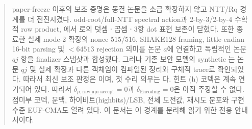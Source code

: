 \documentclass[11pt,a4paper]{article}
\begin{document}
\begin{abstract}
paper-freeze 이후의 보조 증명은 동결 논문을 소급 확장하지 않고 NTT/Rq
경계를 더 전진시켰다. odd-root/full-NTT spectral action과 2-by-3/2-by-4
수학적 row product, 에서
로의 덧셈ㆍ곱셈ㆍ3항 dot 표현 보존이 닫혔다.
또한 종료한 실제 mode-2  확장의 nonce 515/516,
SHAKE128 framing, little-endian 16-bit parsing 및 \(<64513\) rejection 의미를
논문 \(a\)에 연결하고 독립적인 논문 \(qj\) 항을 finalizer 스냅샷과 합성했다.
그러나 기존 보안 모델의 synthetic 는
논문 \(qj\) 및 실제 확장과 다른 객체임이 컴파일된 정리와 구체적 trace로
확인되었다. 따라서 최신 보조 판정은
이며, 첫 수리 의무는
다. 힌트 (h) 코덱은 계속
연기되어 있다.
따라서
\(\delta_{\mu,\mathrm{raw\_api\_accept}}=0\)과
\(\delta_{\mathrm{Encoding}}=0\)은 아직 주장할 수 없다. 접미부 코덱,
문맥, 하이비트(highbits)/LSB, 전체 도전값, 재시도 분포와 구현 수준 EUF-CMA도 열려
있다. 이 문서는 이 경계를 분리해 읽기 위한 전용 안내서이다.
\end{abstract}
\end{document}
